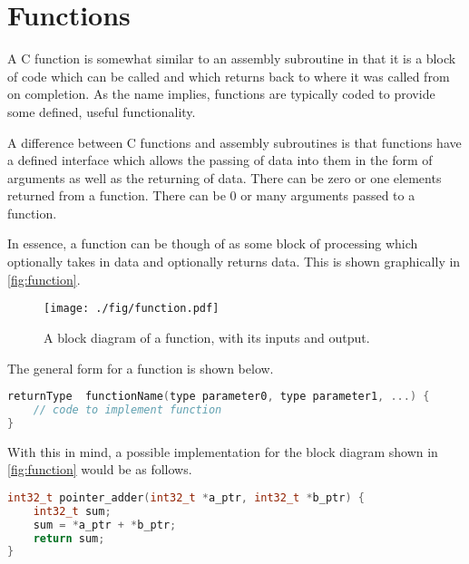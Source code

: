 \chapter{Functions}
A C function is somewhat similar to an assembly subroutine in that it is a block of code which can be called and which returns back to where it was called from on completion. As the name implies, functions are typically coded to provide some defined, useful functionality. 

A difference between C functions and assembly subroutines is that functions have a defined interface which allows the passing of data into them in the form of arguments as well as the returning of data. There can be zero or one elements returned from a function. There can be 0 or many arguments passed to a function.

In essence, a function can be though of as some block of processing which optionally takes in data and optionally returns data. This is shown graphically in \autoref{fig:function}.

\begin{figure}
\centering
\texttt{[image: ./fig/function.pdf]}
\caption{A block diagram of a function, with its inputs and output.}
\label{fig:function}
\end{figure}

The general form for a function is shown below.

\begin{lstlisting}[language=c]
returnType  functionName(type parameter0, type parameter1, ...) {
    // code to implement function
}
\end{lstlisting}

With this in mind, a possible implementation for the block diagram shown in \autoref{fig:function} would be as follows. 

\begin{lstlisting}[language=c]
int32_t pointer_adder(int32_t *a_ptr, int32_t *b_ptr) {
    int32_t sum;
    sum = *a_ptr + *b_ptr;
    return sum;
}
\end{lstlisting}

